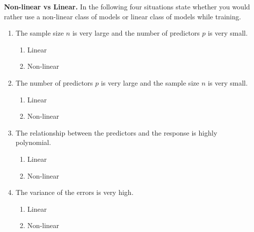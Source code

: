 \item{}
\textbf{Non-linear vs Linear.}
In the following four situations state whether you would rather use a non-linear class of models or linear class of models while training.

\begin{enumerate}
    \item The sample size $n$ is very large and the number of predictors $p$ is very small.
    \begin{enumerate}[label=(\alph*)]
      \item Linear
      \item Non-linear
    \end{enumerate}
    \item The number of predictors $p$ is very large and the sample size $n$ is very small.
    \begin{enumerate}[label=(\alph*)]
      \item Linear
      \item Non-linear
    \end{enumerate}
    \item The relationship between the predictors and the response is highly polynomial.
    \begin{enumerate}[label=(\alph*)]
      \item Linear
      \item Non-linear
    \end{enumerate}
    \item The variance of the errors is very high.
    \begin{enumerate}[label=(\alph*)]
      \item Linear
      \item Non-linear
    \end{enumerate}
\end{enumerate} 
